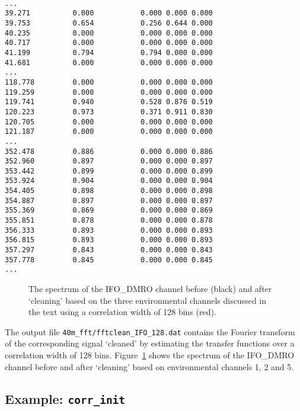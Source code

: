 {\tt 
\begin{verbatim}
... 
39.271          0.000           0.000 0.000 0.000 
39.753          0.654           0.256 0.644 0.000 
40.235          0.000           0.000 0.000 0.000 
40.717          0.000           0.000 0.000 0.000 
41.199          0.794           0.794 0.000 0.000 
41.681          0.000           0.000 0.000 0.000 
...
118.778         0.000           0.000 0.000 0.000 
119.259         0.000           0.000 0.000 0.000 
119.741         0.940           0.528 0.876 0.519 
120.223         0.973           0.371 0.911 0.830 
120.705         0.000           0.000 0.000 0.000 
121.187         0.000           0.000 0.000 0.000 
...
352.478         0.886           0.000 0.000 0.886 
352.960         0.897           0.000 0.000 0.897 
353.442         0.899           0.000 0.000 0.899 
353.924         0.904           0.000 0.000 0.904 
354.405         0.898           0.000 0.000 0.898 
354.887         0.897           0.000 0.000 0.897 
355.369         0.869           0.000 0.000 0.869 
355.851         0.878           0.000 0.000 0.878 
356.333         0.893           0.000 0.000 0.893 
356.815         0.893           0.000 0.000 0.893 
357.297         0.843           0.000 0.000 0.843 
357.778         0.845           0.000 0.000 0.845 
...
\end{verbatim}}
\noindent

\begin{figure}[ht]
\begin{center}
\caption{ \label{f:cleaned} The spectrum of the IFO\_DMRO channel
before (black) and after `cleaning' based on the three environmental
channels  discussed in the text
using a correlation width of 128 bins (red).}
\end{center}
\end{figure}



The output file  {\tt 40m\_fft/fftclean\_IFO\_128.dat} contains the Fourier
transform  of the corresponding signal `cleaned'
by estimating the transfer functions over a correlation width of
128 bins. 
Figure~\ref{f:cleaned} shows the spectrum of the IFO\_DMRO channel
before and after `cleaning' based on environmental channels 1, 2 and 5.


\clearpage
\subsection{Example: {\tt corr\_init} }



